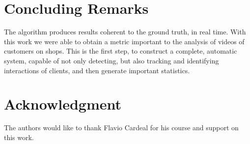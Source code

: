 \documentclass[10pt, conference]{IEEEtran}
\begin{document}
	\section{Concluding Remarks}
	The algorithm produces results coherent to the ground truth, in real time. With this work we were able to obtain a metric important to the analysis of videos of customers on shops. This is the first step, to construct a complete, automatic system, capable of not only detecting, but also tracking and identifying interactions of clients, and then generate important statistics.
	
	\section*{Acknowledgment}
	The authors would like to thank Flavio Cardeal for his course and support on this work.
	
	
	
	
	
\end{document}
